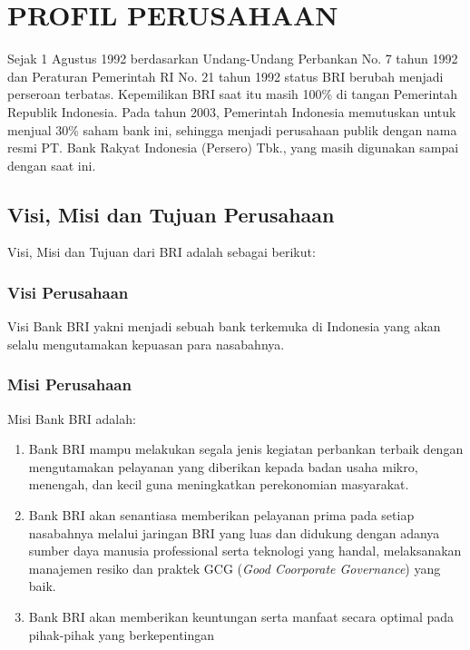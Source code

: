 \chapter{PROFIL PERUSAHAAN}
\tab Sejak 1 Agustus 1992 berdasarkan Undang-Undang Perbankan No. 7 tahun 1992 dan Peraturan Pemerintah RI No. 21 tahun 1992 status BRI berubah menjadi perseroan terbatas. Kepemilikan BRI saat itu masih 100\% di tangan Pemerintah Republik Indonesia. Pada tahun 2003, Pemerintah Indonesia memutuskan untuk menjual 30\% saham bank ini, sehingga menjadi perusahaan publik dengan nama resmi PT. Bank Rakyat Indonesia (Persero) Tbk., yang masih digunakan sampai dengan saat ini\cite{bri}.
\section{Visi, Misi dan Tujuan Perusahaan}
Visi, Misi dan Tujuan dari BRI adalah sebagai berikut:
	\subsection{Visi Perusahaan}
	Visi Bank BRI yakni menjadi sebuah bank terkemuka di Indonesia yang akan selalu mengutamakan kepuasan para nasabahnya.
	\subsection{Misi Perusahaan}
	Misi Bank BRI adalah:
	\begin{enumerate}
		\item Bank BRI mampu melakukan segala jenis kegiatan perbankan terbaik dengan mengutamakan pelayanan yang diberikan kepada badan usaha mikro, menengah, dan kecil guna meningkatkan perekonomian masyarakat.
		\item Bank BRI akan senantiasa memberikan pelayanan prima pada setiap nasabahnya melalui jaringan BRI yang luas dan didukung dengan adanya sumber daya manusia professional serta teknologi yang handal, melaksanakan manajemen resiko dan praktek GCG (\textit{Good Coorporate Governance}) yang baik.
		\item Bank BRI akan memberikan keuntungan serta manfaat secara optimal pada pihak-pihak yang berkepentingan
	\end{enumerate}
